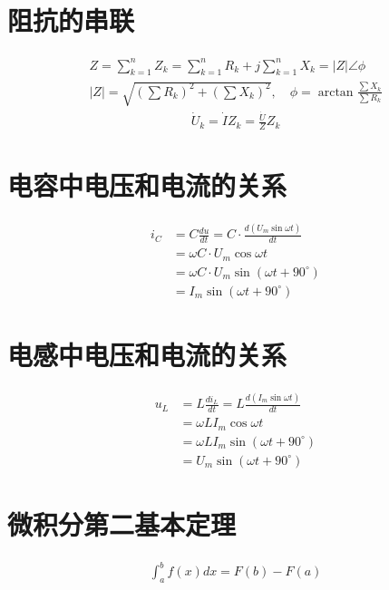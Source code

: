 \documentclass{ctexart}
\begin{document}
\section{阻抗的串联}
\begin{gather*}
Z = \sum_{k=1}^n Z_k = \sum_{k=1}^n R_k + j\sum_{k=1}^n X_k = \left\vert Z \right\vert \angle\phi \\
\left\vert Z \right\vert = \sqrt{(\sum R_k)^2 + (\sum X_k)^2},\quad \phi = \arctan\frac{\sum X_k}{\sum R_k}
\end{gather*}
\begin{gather*}
\dot{U}_k = \dot{I}Z_k = \frac{\dot{U}}{Z}Z_k
\end{gather*}

\section{电容中电压和电流的关系}
\begin{align*}
i_C &= C\frac{du}{dt} = C \cdot \frac{d(U_m\sin\omega t)}{dt} \\
    &= \omega C \cdot U_m\cos\omega t \\
    &= \omega C \cdot U_m\sin(\omega t + 90^\circ) \\
    &= I_m\sin(\omega t + 90^\circ)
\end{align*}

\section{电感中电压和电流的关系}
\begin{align*}
u_L &= L\frac{di_L}{dt} = L\frac{d(I_m\sin\omega t)}{dt} \\
    &= \omega L I_m\cos\omega t \\
    &= \omega L I_m\sin(\omega t + 90^\circ) \\
    &= U_m\sin(\omega t + 90^\circ)
\end{align*}

\section{微积分第二基本定理}
\begin{gather*}
\int_{a}^{b} f(x)dx = F(b) - F(a)
\end{gather*}
\end{document}
